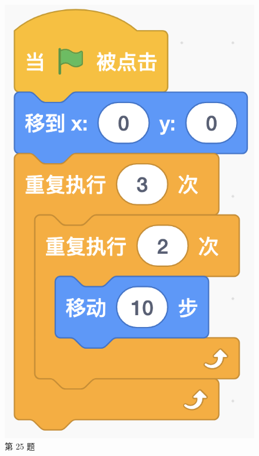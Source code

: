 \documentclass[10pt, a4paper]{article}
\begin{document}
\begin{figure}[htbp]
\begin{minipage}[t]{.14\textwidth}
            \includegraphics[width=\textwidth]{25.png}
            \caption*{第 25 题}
        \end{minipage}
        \begin{minipage}[t]{.29\textwidth}
            \begin{minipage}[t]{.45\textwidth}
                \centering

\end{minipage}
\end{minipage}
\end{figure}
\end{document}
